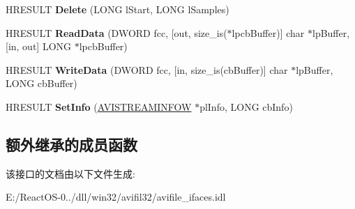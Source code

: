 \begin{DoxyCompactItemize}
\item 
\mbox{\label{interface_i_a_v_i_stream_a3ac06d98bfc6f75bacdafdef1499b53e}} 
H\+R\+E\+S\+U\+LT {\bfseries Delete} (L\+O\+NG l\+Start, L\+O\+NG l\+Samples)
\item 
\mbox{\label{interface_i_a_v_i_stream_a69a82ef577a169ec37679669e2175b40}} 
H\+R\+E\+S\+U\+LT {\bfseries Read\+Data} (D\+W\+O\+RD fcc, \mbox{[}out, size\+\_\+is($\ast$lpcb\+Buffer)\mbox{]} char $\ast$lp\+Buffer, \mbox{[}in, out\mbox{]} L\+O\+NG $\ast$lpcb\+Buffer)
\item 
\mbox{\label{interface_i_a_v_i_stream_af06cefce5311aae0a86c6b5d9819a6c3}} 
H\+R\+E\+S\+U\+LT {\bfseries Write\+Data} (D\+W\+O\+RD fcc, \mbox{[}in, size\+\_\+is(cb\+Buffer)\mbox{]} char $\ast$lp\+Buffer, L\+O\+NG cb\+Buffer)
\item 
\mbox{\label{interface_i_a_v_i_stream_a45717d1709e9ed561538f219caafff7a}} 
H\+R\+E\+S\+U\+LT {\bfseries Set\+Info} (\hyperlink{struct___a_v_i_s_t_r_e_a_m_i_n_f_o_w}{A\+V\+I\+S\+T\+R\+E\+A\+M\+I\+N\+F\+OW} $\ast$pl\+Info, L\+O\+NG cb\+Info)
\end{DoxyCompactItemize}
\subsection*{额外继承的成员函数}


该接口的文档由以下文件生成\+:\begin{DoxyCompactItemize}
\item 
E\+:/\+React\+O\+S-\/0../dll/win32/avifil32/avifile\+\_\+ifaces.\+idl\end{DoxyCompactItemize}
